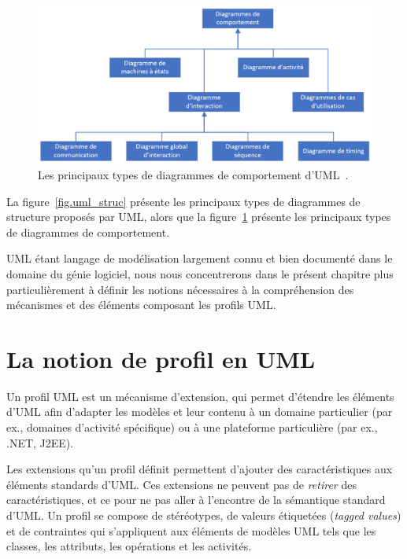 \begin{figure}
    \centering
    \includegraphics[width=12cm]{10_img/chap4/comportement.PNG}
    \caption{Les principaux types de diagrammes de comportement d'UML~\cite{OMG_UML}.}
    \label{fig.uml_comp}
\end{figure}



La figure~\ref{fig.uml_struc} présente les principaux types de diagrammes de structure proposés par UML,
alors que la figure~\ref{fig.uml_comp} présente les principaux types de diagrammes de comportement.

UML \'etant langage de modélisation largement connu et bien documenté dans le domaine du g\'enie logiciel,
nous nous concentrerons dans le pr\'esent chapitre plus particulièrement à définir les notions nécessaires à la compréhension des mécanismes et des éléments composant les profils UML.



\section{La notion de profil en UML}



Un profil UML est un m\'ecanisme d'extension, qui
permet d'étendre les éléments d'UML afin d'adapter les mod\`eles et leur contenu à un domaine particulier (par ex.,  domaines d'activité spécifique) ou \`a une plateforme particulière (par ex.,  .NET, J2EE).

Les extensions qu'un profil d\'efinit permettent d'ajouter des caractéristiques aux éléments standards d'UML.
Ces extensions ne peuvent pas de \emph{retirer} des caractéristiques, et ce pour ne pas aller à l'encontre de la sémantique standard d'UML.
Un profil se compose  de stéréotypes, de valeurs \'etiquet\'ees (\emph{tagged values}) et de contraintes qui s'appliquent aux éléments de modèles UML tels que les classes, les attributs, les opérations et les activités.

